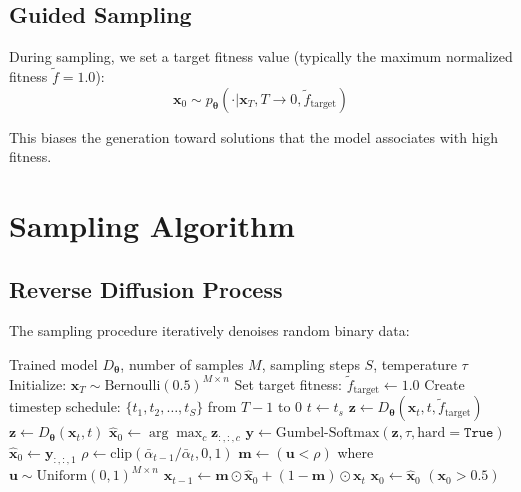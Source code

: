 \documentclass[11pt,a4paper]{article}
\newcommand{\vx}{\mathbf{x}}
\newcommand{\vtheta}{\boldsymbol{\theta}}
\begin{document}
\subsection{Guided Sampling}

During sampling, we set a target fitness value (typically the maximum normalized fitness $\tilde{f} = 1.0$):
\begin{equation}
    \vx_0 \sim p_\vtheta(\cdot | \vx_T, T \rightarrow 0, \tilde{f}_{\text{target}})
\end{equation}

This biases the generation toward solutions that the model associates with high fitness.

\section{Sampling Algorithm}

\subsection{Reverse Diffusion Process}

The sampling procedure iteratively denoises random binary data:

\begin{algorithm}[H]
\caption{Sampling from Discrete Dendiff-Gumbel}
\label{alg:sampling}
\begin{algorithmic}[1]
\Require Trained model $D_\vtheta$, number of samples $M$, sampling steps $S$, temperature $\tau$
\State Initialize: $\vx_T \sim \text{Bernoulli}(0.5)^{M \times n}$ 
    \State Set target fitness: $\tilde{f}_{\text{target}} \gets 1.0$ 
\EndIf
\State Create timestep schedule: $\{t_1, t_2, \ldots, t_S\}$ from $T-1$ to $0$
    \State $t \gets t_s$
        \State $\mathbf{z} \gets D_\vtheta(\vx_t, t, \tilde{f}_{\text{target}})$
    \Else
        \State $\mathbf{z} \gets D_\vtheta(\vx_t, t)$
    \EndIf
        \State $\hat{\vx}_0 \gets \arg\max_c \mathbf{z}_{:,:,c}$
    \Else
        \State $\mathbf{y} \gets \text{Gumbel-Softmax}(\mathbf{z}, \tau, \text{hard}=\texttt{True})$
        \State $\hat{\vx}_0 \gets \mathbf{y}_{:,:,1}$ 
    \EndIf
        \State $\rho \gets \text{clip}(\bar{\alpha}_{t-1} / \bar{\alpha}_t, 0, 1)$ 
        \State $\mathbf{m} \gets (\mathbf{u} < \rho)$ where $\mathbf{u} \sim \text{Uniform}(0,1)^{M \times n}$
        \State $\vx_{t-1} \gets \mathbf{m} \odot \hat{\vx}_0 + (1 - \mathbf{m}) \odot \vx_t$
    \Else
        \State $\vx_0 \gets \hat{\vx}_0$
    \EndIf
\EndFor
\State \Return $(\vx_0 > 0.5)$ 
\end{algorithmic}
\end{algorithm}
\end{document}
